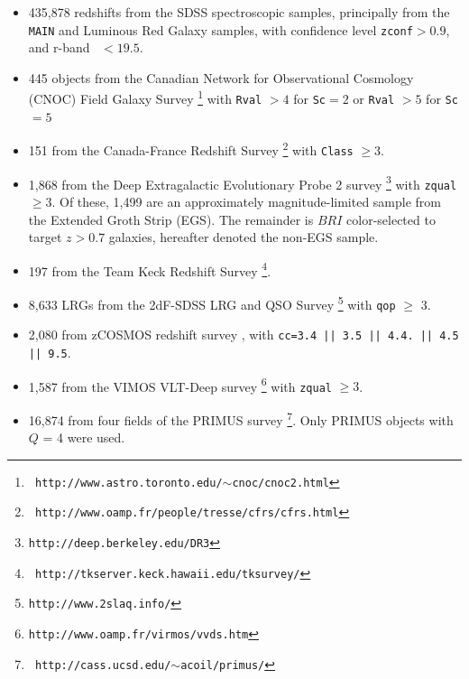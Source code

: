 \documentclass[preprint]{aastex}
\begin{document}
\begin{itemize} 

    \item 435,878 redshifts from the SDSS spectroscopic samples, principally
    from the \texttt{MAIN} \citep{Strauss02} and Luminous Red Galaxy
    \citep[\texttt{LRG};][]{Eisenstein01} samples, with confidence level
    \texttt{zconf}$ > 0.9$, and r-band \cmodelmag\ $ <19.5$.


    \item 445 objects from the Canadian Network for Observational Cosmology
    (CNOC) Field Galaxy Survey \cite[CNOC2;][]{yee00}\footnote{\tt
    http://www.astro.toronto.edu/$\sim$cnoc/cnoc2.html} with \texttt{Rval} $>4$
    for \texttt{Sc}$=2$ or \texttt{Rval} $> 5$ for \texttt{Sc}$=5$

    \item 151 from the Canada-France Redshift Survey
    \cite[CFRS;][]{lilly95}\footnote{\tt
    http://www.oamp.fr/people/tresse/cfrs/cfrs.html} with \texttt{Class} $\geq
    3$.

    \item 1,868 from the Deep Extragalactic Evolutionary Probe 2 survey
    \citep[DEEP2;][]{weiner05}\footnote{\tt http://deep.berkeley.edu/DR3} with
    \texttt{zqual} $\geq 3$.  Of these, 1,499 are an approximately
    magnitude-limited sample from the Extended Groth Strip (EGS).  The
    remainder is $BRI$ color-selected to target $z>0.7$ galaxies, hereafter
    denoted the non-EGS sample. 

    \item 197 from the Team Keck Redshift Survey
    \cite[TKRS;][]{wirth04}\footnote{\tt
    http://tkserver.keck.hawaii.edu/tksurvey/}.

    \item 8,633 LRGs from the 2dF-SDSS LRG and QSO Survey
    \cite[2SLAQ;][]{cannon06}\footnote{\tt http://www.2slaq.info/} with
    \texttt{qop} $\geq$ 3.

    \item  2,080 from zCOSMOS redshift survey \cite{lilly07}, with
    \texttt{cc=3.4 || 3.5 || 4.4.  || 4.5 || 9.5}.
    
    \item 1,587 from the VIMOS VLT-Deep survey
    \cite[VVDS;][]{garilli08}\footnote{\tt http://www.oamp.fr/virmos/vvds.htm}
    with \texttt{zqual} $\geq 3$.

    \item 16,874 from four fields of the PRIMUS survey
    \cite[PRIMUS;][]{coil10,cool12}\footnote{\tt
    http://cass.ucsd.edu/$\sim$acoil/primus/}.  Only PRIMUS objects with $Q$ =
    4 were used.      \end{itemize}
\end{document}
